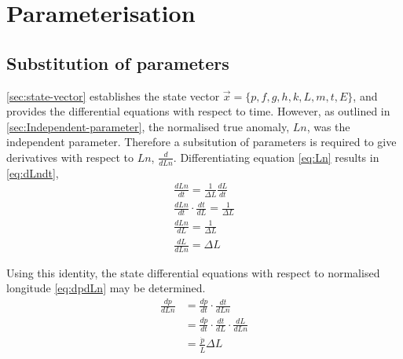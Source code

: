 \section{Parameterisation} \label{sec:Parameterisation}

\subsection{Substitution of parameters}\label{sub:subst-param}
\autoref{sec:state-vector} establishes the state vector $\vec{x}=\{p,f,g,h,k,L,m,t,E\}$, and provides the differential equations with respect to time. However, as outlined in \autoref{sec:Independent-parameter}, the normalised true anomaly, $Ln$, was the independent parameter. Therefore a subsitution of parameters is required to give derivatives with respect to $Ln$, $\frac{d}{dLn}$. Differentiating equation \eqref{eq:Ln} results in \eqref{eq:dLndt},
\begin{subequations} \label{eq:dLndt}
\begin{gather}
\frac{dLn}{dt}=\frac{1}{\Delta L}\frac{dL}{dt} \\
\frac{dLn}{dt}\cdot\frac{dt}{dL}=\frac{1}{\Delta L} \\
\frac{dLn}{dL}=\frac{1}{\Delta L} \\
\frac{dL}{dLn}=\Delta L
\end{gather}
\end{subequations}

Using this identity, the state differential equations with respect to normalised longitude \eqref{eq:dpdLn} may be determined.
\begin{subequations}\label{eq:dpdLn}
\begin{align}
\frac{dp}{dLn}&=\frac{dp}{dt}\cdot\frac{dt}{dLn}\\
&=\frac{dp}{dt}\cdot\frac{dt}{dL}\cdot\frac{dL}{dLn}\\
&=\frac{\dot{p}}{\dot{L}}\Delta L
\end{align}
\end{subequations}

